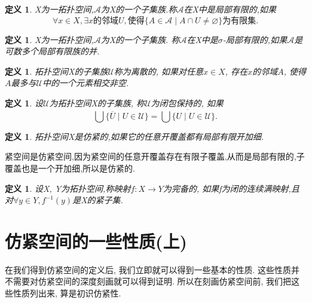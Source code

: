 \documentclass[a4paper,UTF8]{ctexart}
\newtheorem{definition}[theorem]{定义}
\begin{document}
\begin{definition} \label{def:local finite}
  X为一拓扑空间,$\mathscr{A}$为X的一个子集族.称$\mathscr{A}$在X中是\emph{局部有限}的,如果
  \begin{equation*}
    \forall x \in X, \exists x \text{的邻域}U,\text{使得}
    \{A \in \mathscr{A} \mid A \cap U \neq \varnothing \}\text{为有限集}.
  \end{equation*}
\end{definition}

\begin{definition} \label{def:sigma local finit}
  X为一拓扑空间,$\mathscr{A}$为X的一个子集族.
  称$\mathscr{A}$在X中是\emph{$\sigma$-局部有限}的,如果$\mathscr{A}$是可数多个局部有限族的并.
\end{definition}

\begin{definition} \label{def:discrete}
  拓扑空间X的子集族$\mathscr{U}$称为\emph{离散的}, 如果对任意$x \in X$,
  存在$x$的邻域$A$, 使得$A$最多与$\mathscr{U}$中的一个元素相交非空.
\end{definition}

\begin{definition} \label{def:closure-preserving}
  设$\mathscr{U}$为拓扑空间X的子集族, 称$\mathscr{U}$为\emph{闭包保持}的, 如果
  \[
    \bigcup \{ \overline{U} \mid U \in \mathscr{U} \}
    = \overline{\bigcup \{ U \mid U \in \mathscr{U} \}}.
  \]
\end{definition}

\begin{definition} \label{def:paracompact}
  拓扑空间X是\emph{仿紧}的,如果它的任意开覆盖都有局部有限开加细.
\end{definition}
紧空间是仿紧空间,因为紧空间的任意开覆盖存在有限子覆盖,从而是局部有限的,子覆盖也是一个开加细,所以是仿紧的.

\begin{definition}
  设X, Y为拓扑空间,称映射$f : X \longrightarrow Y$为\emph{完备的},
  如果f为闭的连续满映射,且对$\forall y \in Y, f^{-1}(y)$是X的紧子集.
\end{definition}

\section{仿紧空间的一些性质(上)}
在我们得到仿紧空间的定义后, 我们立即就可以得到一些基本的性质.
这些性质并不需要对仿紧空间的深度刻画就可以得到证明.
所以在刻画仿紧空间前, 我们把这些性质列出来, 算是初识仿紧性.
\end{document}
